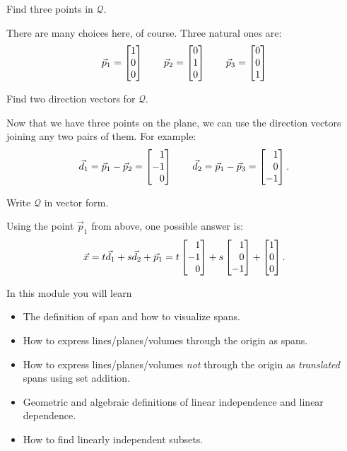 	\begin{parts}
		\item Find three points in $\mathcal Q$.
			\begin{solution}
				There are many choices here, of course. Three natural ones are:
				\[
					\vec p_1 = \mat{1\\0\\0}
					\qquad
					\vec p_2 = \mat{0\\1\\0}
					\qquad
					\vec p_3 = \mat{0\\0\\1}
				\]
			\end{solution}
		\item Find two direction vectors for $\mathcal Q$.
			\begin{solution}
				Now that we have three points on the plane, we can use the
				direction vectors joining any two pairs of them. For example:
				\[
					\vec d_1 = \vec p_1 - \vec p_2 = \mat{1\\-1\\0}
					\qquad
					\vec d_2 = \vec p_1 - \vec p_3 = \mat{1\\0\\-1}.
				\]
			\end{solution}
		\item Write $\mathcal Q$ in vector form.
			\begin{solution}
				Using the point $\vec p_1$ from above, one possible answer is:
				\[
					\vec x = t\vec d_1 + s\vec d_2 + \vec p_1
					= t \mat{1\\-1\\0} + s \mat{1\\0\\-1} + \mat{1\\0\\0}.
				\]
			\end{solution}
	\end{parts}

\begin{module}

	In this module you will learn
	\begin{itemize}
		\item The definition of span and how to visualize spans.
		\item How to express lines/planes/volumes through the origin as spans.
		\item How to express lines/planes/volumes \emph{not} through the origin as
			\emph{translated} spans using set addition.
		\item Geometric and algebraic definitions of linear independence and linear 
			dependence.
		\item How to find linearly independent subsets.
	\end{itemize}

	
	
\end{module}


